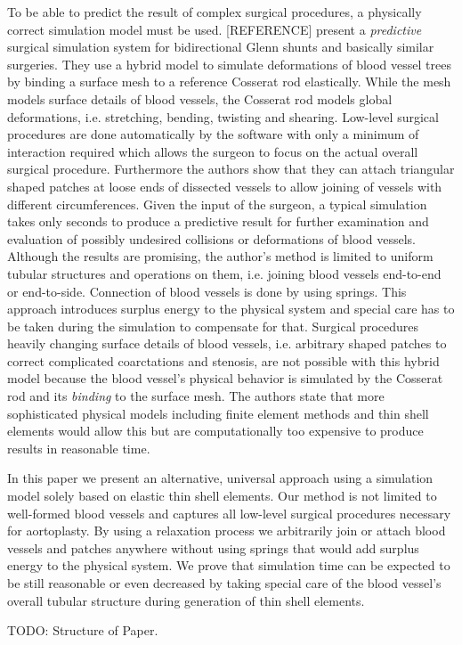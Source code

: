 To be able to predict the result of complex surgical procedures, a physically correct simulation model must be used. [REFERENCE] present a \emph{predictive} surgical simulation system for bidirectional Glenn shunts and basically similar surgeries. They use a hybrid model to simulate deformations of blood vessel trees by binding a surface mesh to a reference Cosserat rod elastically. While the mesh models surface details of blood vessels, the Cosserat rod models global deformations, i.e. stretching, bending, twisting and shearing. Low-level surgical procedures are done automatically by the software with only a minimum of interaction required which allows the surgeon to focus on the actual overall surgical procedure. Furthermore the authors show that they can attach triangular shaped patches at loose ends of dissected vessels to allow joining of vessels with different circumferences. Given the input of the surgeon, a typical simulation takes only seconds to produce a predictive result for further examination and evaluation of possibly undesired collisions or deformations of blood vessels. Although the results are promising, the author's method is limited to uniform tubular structures and operations on them, i.e. joining blood vessels end-to-end or end-to-side. Connection of blood vessels is done by using springs. This approach introduces surplus energy to the physical system and special care has to be taken during the simulation to compensate for that. Surgical procedures heavily changing surface details of blood vessels, i.e. arbitrary shaped patches to correct complicated coarctations and stenosis, are not possible with this hybrid model because the blood vessel's physical behavior is simulated by the Cosserat rod and its \emph{binding} to the surface mesh. The authors state that more sophisticated physical models including finite element methods and thin shell elements would allow this but are computationally too expensive to produce results in reasonable time.

In this paper we present an alternative, universal approach using a simulation model solely based on elastic thin shell elements. Our method is not limited to well-formed blood vessels and captures all low-level surgical procedures necessary for aortoplasty. By using a relaxation process we arbitrarily join or attach blood vessels and patches anywhere without using springs that would add surplus energy to the physical system. We prove that simulation time can be expected to be still reasonable or even decreased by taking special care of the blood vessel's overall tubular structure during generation of thin shell elements.

TODO: Structure of Paper.
